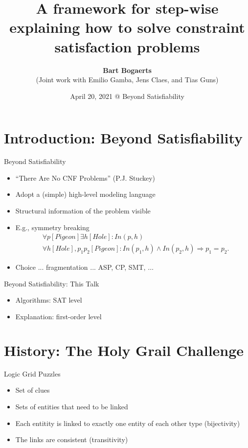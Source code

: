 \documentclass[12pt,aspectratio=169]{beamer}
\title{A framework for step-wise explaining how to solve constraint satisfaction problems}
\author{{\bf Bart Bogaerts} \\(Joint work with Emilio Gamba, Jens Claes, and Tias Guns)}
\date{April 20, 2021 @ Beyond Satisfiability}
\newcommand\limplies\Rightarrow
\begin{document}
\frame{\maketitle} %



\section{Introduction: Beyond Satisfiability}
\begin{frame}{Beyond Satisfiability}
 \begin{itemize}
  \item ``There Are No CNF Problems'' (P.J. Stuckey) 
  \item Adopt a (simple) high-level modeling language  \pause
  \item Structural information of the problem visible
  \item E.g., symmetry breaking
  \begin{align*}& \forall p[Pigeon] \exists h [Hole]: In(p,h)\\
   &\forall h [Hole], p_1 p_2 [Pigeon]: In(p_1,h) \land In(p_2,h) \limplies p_1 = p_2.
  \end{align*}
  \pause
  \item Choice ... fragmentation ... ASP, CP, SMT, $\dots $
   \end{itemize}
\end{frame}

\begin{frame}{Beyond Satisfiability: This Talk}
\begin{itemize}
  \item Algorithms: SAT level
  \item Explanation: first-order level
 \end{itemize} 
\end{frame}


\section{History: The Holy Grail Challenge}

\begin{frame}{Logic Grid Puzzles}
 \begin{itemize}
  \item Set of clues
  \item Sets of entities that need to be linked
  \item Each entitity is linked to exactly one entity of each other type (bijectivity)
  \item The links are consistent (transitivity)
 \end{itemize}
\end{frame}
\end{document}
